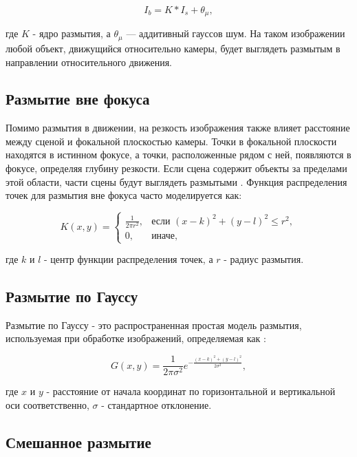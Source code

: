 \begin{equation}
	I_{b} = K * I_{s} + \theta_{\mu},
\end{equation}

где \(K\) - ядро размытия, а \(\theta_{\mu}\) — аддитивный гауссов шум. На таком изображении любой объект, движущийся относительно камеры, будет выглядеть размытым в направлении относительного движения.

\subsection{Размытие вне фокуса}

Помимо размытия в движении, на резкость изображения также влияет расстояние между сценой и фокальной плоскостью камеры. Точки в фокальной плоскости находятся в истинном фокусе, а точки, расположенные рядом с ней, появляются в фокусе, определяя глубину резкости. Если сцена содержит объекты за пределами этой области, части сцены будут выглядеть размытыми \cite{zhang2020deblurring}. Функция распределения точек для размытия вне фокуса часто моделируется как:

\begin{equation}\label{eq:deblurring}
	K(x, y) = \begin{cases}
		\frac{1}{2 \pi r^2}, & \text{если } (x - k)^2 + (y - l)^2 \leq r^2, \\
		0, & \text{иначе},
	\end{cases}
\end{equation}

где \(k\) и \(l\) - центр функции распределения точек, а \(r\) - радиус размытия.

\subsection{Размытие по Гауссу}

Размытие по Гауссу - это распространенная простая модель размытия, используемая при обработке изображений, определяемая как \cite{chen2009empirical}:

\begin{equation}
	G(x, y) = \frac{1}{2 \pi \sigma^2} e^{-\frac{(x - k)^2 + (y - l)^2}{2 \sigma^2}},
\end{equation}

где \(x\) и \(y\) - расстояние от начала координат по горизонтальной и вертикальной оси соответственно, \(\sigma\) - стандартное отклонение.


\subsection{Смешанное размытие}

